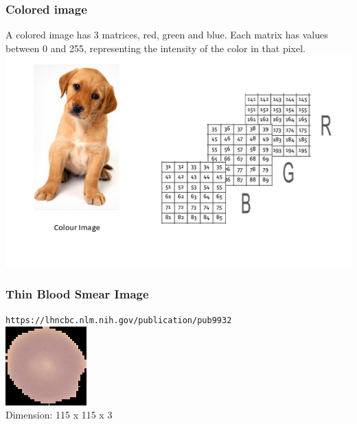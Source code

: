 \begin{frame}[fragile]
  \frametitle{Colored image}
  A colored image has 3 matrices, red, green and blue. Each matrix has
  values between 0 and 255, representing the intensity of the color in that
  pixel.\\
  \vspace{3mm}
  \includegraphics[scale=0.4]{img/img_3}
\end{frame}

\begin{frame}[fragile]
  \frametitle{Thin Blood Smear Image}
  \verb|https://lhncbc.nlm.nih.gov/publication/pub9932|\\
  \vspace{3mm}
  \includegraphics[scale=1]{img/img_4}\\
  \vspace{3mm}
  Dimension: 115 x 115 x 3
\end{frame}

